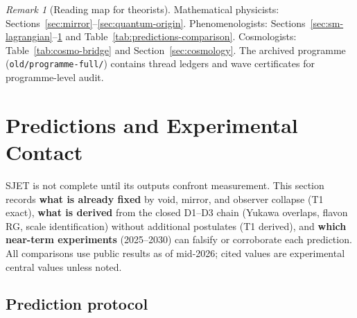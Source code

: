 \documentclass[aps,prd,onecolumn,amsmath,amssymb,nofootinbib,11pt]{revtex4-2}
\numberwithin{equation}{section}
\theoremstyle{plain}
\theoremstyle{definition}
\theoremstyle{remark}
\newtheorem{remark}[theorem]{Remark}
\begin{document}
\begin{remark}[Reading map for theorists]
Mathematical physicists: Sections~\ref{sec:mirror}--\ref{sec:quantum-origin}.
Phenomenologists: Sections~\ref{sec:sm-lagrangian}--\ref{sec:predictions} and
Table~\ref{tab:predictions-comparison}. Cosmologists:
Table~\ref{tab:cosmo-bridge} and Section~\ref{sec:cosmology}. The
archived programme (\texttt{old/programme-full/}) contains thread ledgers and
wave certificates for programme-level audit.
\end{remark}%
\section{Predictions and Experimental Contact}
\label{sec:predictions}

SJET is not complete until its outputs confront measurement. This section
records \textbf{what is already fixed} by void, mirror, and observer collapse
(T1 exact), \textbf{what is derived} from the closed D1--D3 chain (Yukawa
overlaps, flavon RG, scale identification) without additional postulates
(T1 derived), and \textbf{which near-term experiments} (2025--2030) can
falsify or corroborate each prediction. All comparisons use public results as
of mid-2026; cited values are experimental central values unless noted.

\subsection{Prediction protocol}
\label{sec:predictions:protocol}
\end{document}
